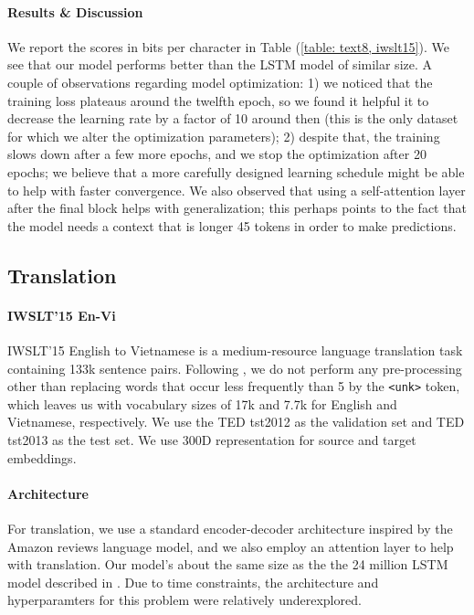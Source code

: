\documentclass{article}
\begin{document}
\paragraph{Results \& Discussion} We report the scores in bits per character in Table (\ref{table: text8, iwslt15}). We see that our model performs better than the LSTM model of similar size. A couple of observations regarding model optimization: 1) we noticed that the training loss plateaus around the twelfth epoch, so we found it helpful it to decrease the learning rate by a factor of 10 around then (this is the only dataset for which we alter the optimization parameters); 2) despite that, the training slows down after a few more epochs, and we stop the optimization after 20 epochs; we believe that a more carefully designed learning schedule might be able to help with faster convergence. We also observed that using a self-attention layer after the final block helps with generalization; this perhaps points to the fact that the model needs a context that is longer 45 tokens in order to make predictions.  

\subsection{Translation}

\paragraph{IWSLT'15 En-Vi} IWSLT'15 English to Vietnamese is a medium-resource language translation task containing 133k sentence pairs. Following \citet{luong2015stanford}, we do not perform any pre-processing other than replacing words that occur less frequently than 5 by the \texttt{<unk>} token, which leaves us with vocabulary sizes of 17k and 7.7k for English and Vietnamese, respectively. We use the TED tst2012 as the validation set and TED tst2013 as the test set. We use 300D representation for source and target embeddings.


\paragraph{Architecture} For translation, we use a standard encoder-decoder architecture inspired by the Amazon reviews language model, and we also employ an attention layer to help with translation. Our model's about the same size as the the 24 million LSTM model described in \citet{luong2015stanford}. Due to time constraints, the architecture and hyperparamters for this problem were relatively underexplored. 
\end{document}

